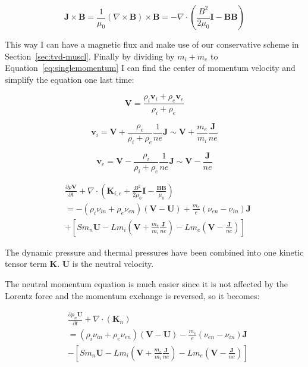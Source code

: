 \documentclass[12pt,upcase]{umlthesis}
\begin{document}
\begin{equation}
	\textbf{J} \times \textbf{B} = \frac{1}{\mu_0} (\nabla \times \textbf{B}) \times \textbf{B} = -\nabla \cdot (\frac{B^2}{2\mu_0}\textbf{I} - \textbf{BB})
\end{equation}

This way I can have a magnetic flux and make use of our conservative scheme in Section~\ref{sec:tvd-muscl}. Finally by dividing by $m_i+m_e$ to Equation~\ref{eq:singlemomentum} I can find the center of momentum velocity and simplify the equation one last time:

\begin{equation}
	\textbf{V} = \frac{\rho_i \textbf{v}_i + \rho_e \textbf{v}_e}{\rho_i+\rho_e}
\end{equation}

\begin{equation}\label{eq:vi}
	\textbf{v}_i = \textbf{V} + \frac{\rho_e}{\rho_i+\rho_e} \frac{1}{n e} \textbf{J} \sim \textbf{V} + \frac{m_e}{m_i} \frac{\textbf{J}}{n e} 
\end{equation}

\begin{equation}\label{eq:ve}
	\textbf{v}_e = \textbf{V} - \frac{\rho_i}{\rho_i+\rho_e} \frac{1}{n e} \textbf{J} \sim \textbf{V} -\frac{\textbf{J} }{n e}
\end{equation}

\begin{equation}\label{eq:momentumcom}
\begin{aligned}
	&\frac{\partial \rho \textbf{V}}{\partial t} + \nabla \cdot (\textbf{K}_{i,e} + \frac{B^2}{2\mu_0}\textbf{I} - \frac{\textbf{BB}}{\mu_0}) \\
	&= - (\rho_i \nu_{in} + \rho_e \nu_{en})(\textbf{V} - \textbf{U}) + \frac{m_e}{e}(\nu_{en}-\nu_{in}) \textbf{J} \\
	& + [S m_n \textbf{U} - L m_i (\textbf{V} + \frac{m_e}{m_i} \frac{\textbf{J}}{n e})- L m_e (\textbf{V} -\frac{\textbf{J}}{n e})]
\end{aligned}
\end{equation}

The dynamic pressure and thermal pressures have been combined into one kinetic tensor term $\textbf{K}$. $\textbf{U}$ is the neutral velocity.

The neutral momentum equation is much easier since it is not affected by the Lorentz force and the momentum exchange is reversed, so it becomes:

\begin{equation}\label{eq:momentumneutral}
\begin{aligned}
	&\frac{\partial \rho_n \textbf{U}}{\partial t} + \nabla \cdot (\textbf{K}_n) \\
	&= (\rho_i \nu_{in} + \rho_e \nu_{en})(\textbf{V} - \textbf{U}) - \frac{m_e}{e}(\nu_{en}-\nu_{in}) \textbf{J} \\
	& - [S m_n \textbf{U} - L m_i (\textbf{V} + \frac{m_e}{m_i} \frac{\textbf{J}}{n e})- L m_e (\textbf{V} -\frac{\textbf{J}}{n e})]
\end{aligned}
\end{equation}
\end{document}
